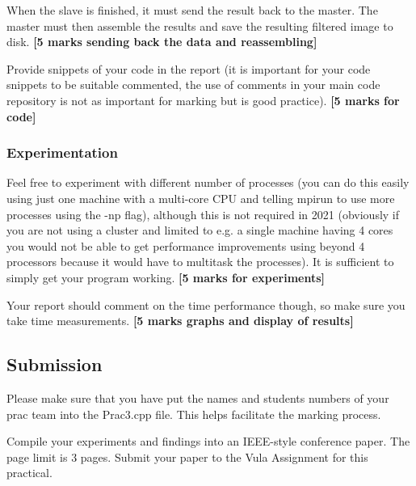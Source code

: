When the slave is finished, it must send the result back to the master. The master must then assemble the results and save the resulting filtered image to disk. \textbf{[5 marks sending back the data and reassembling]}

Provide snippets of your code in the report (it is important for your code snippets to be suitable commented, the use of comments in your main code repository is not as important for marking but is good practice). \textbf{[5 marks for code]}

\subsubsection{Experimentation}
Feel free to experiment with different number of processes (you can do this easily using just one machine with a multi-core CPU and telling mpirun to use more processes using the -np flag), although this is not required in 2021 (obviously if you are not using a cluster and limited to e.g. a single machine having 4 cores you would not be able to get performance improvements using beyond 4 processors because it would have to multitask the processes). It is sufficient to simply get your program working. \textbf{[5 marks for experiments]}

Your report should comment on the time performance though, so make sure you take time measurements. \textbf{[5 marks graphs and display of results]}

\subsection{Submission}

Please make sure that you have put the names and students numbers of your prac team into the Prac3.cpp file. This helps facilitate the marking process.

Compile your experiments and findings into an IEEE-style conference paper. 
The page limit is 3 pages. Submit your paper to the Vula Assignment for this practical.

